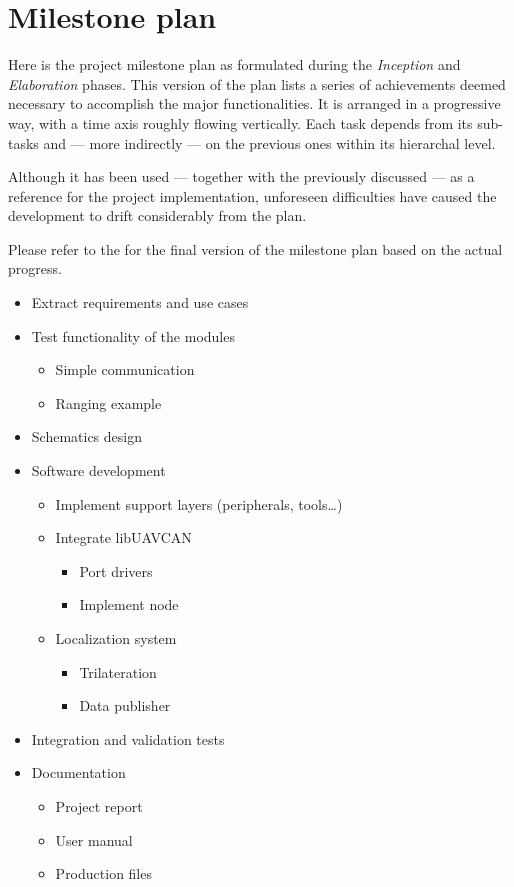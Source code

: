 \section{Milestone plan}

Here is the project milestone plan as formulated during the \emph{Inception} and \emph{Elaboration} phases.
This version of the plan lists a series of achievements deemed necessary to accomplish the major functionalities.
It is arranged in a progressive way, with a time axis roughly flowing vertically.
Each task depends from its sub-tasks and --- more indirectly --- on the previous ones within its hierarchal level.

Although it has been used --- together with the previously discussed  --- as a reference for the project implementation, unforeseen difficulties have caused the development to drift considerably from the plan.

Please refer to the  for the final version of the milestone plan based on the actual progress.

\renewcommand{\labelitemi}{\textbullet}
\renewcommand{\labelitemii}{\textbullet}
\renewcommand{\labelitemiii}{\textbullet}
\renewcommand{\labelitemiv}{\textbullet}
\begin{itemize}
\item Extract requirements and use cases
\item Test functionality of the modules
	\begin{itemize}
	\item Simple communication
	\item Ranging example
\end{itemize}
\item Schematics design
\item Software development
	\begin{itemize}
	\item Implement support layers (peripherals, tools\dots)
	\item Integrate libUAVCAN
	\begin{itemize}
		\item Port drivers
		\item Implement node
	\end{itemize}
	\item Localization system
	\begin{itemize}
		\item Trilateration
		\item Data publisher
	\end{itemize}
\end{itemize}
\item Integration and validation tests
\item Documentation
	\begin{itemize}
	\item Project report
	\item User manual
	\item Production files
\end{itemize}
\end{itemize}
